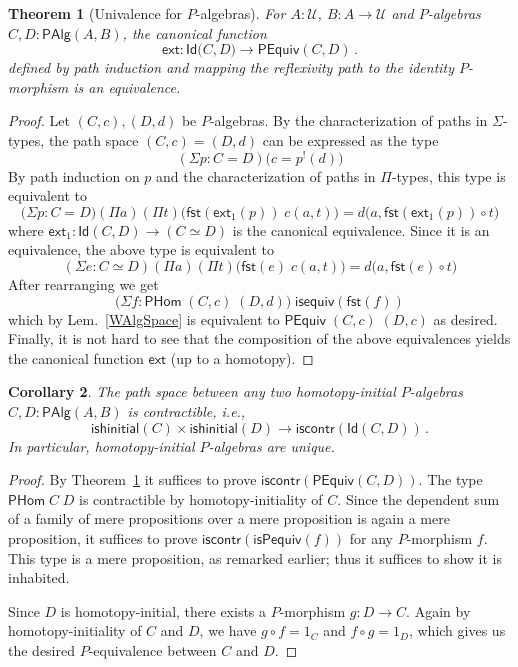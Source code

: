 \documentclass[10pt,a4paper,oneside,reqno]{amsart}
\numberwithin{equation}{section}
\theoremstyle{mythm}
\newtheorem{theorem}{Theorem}[section]
\newtheorem{corollary}[theorem]{Corollary}
\theoremstyle{mydef}
\theoremstyle{myrmk}
\newcommand{\co}{\colon}
\newcommand{\comp}{\circ}
\newcommand{\iscontr}{\mathsf{iscontr}}
\newcommand{\isequiv}{\mathsf{isequiv}}
\newcommand{\ext}{\mathsf{ext}}
\newcommand{\U}{\mathcal{U}}
\newcommand{\fst}{\mathsf{fst}}
\newcommand{\Id}{\mathsf{Id}}
\newcommand{\WAlg}{\mathsf{PAlg}}
\newcommand{\WHom}{\mathsf{PHom}}
\begin{document}
\begin{theorem}[Univalence for $P$-algebras] \label{thm:Punivalence}
For $A:\U$, $B : A \to \U$ and $P$-algebras $C,D  : \WAlg(A,B)$, the canonical function
\[ 
\ext : \Id \big(C,D\big) \to  \mathsf{PEquiv}(C,D) \, .
\]
defined by path induction and mapping the reflexivity path to the identity $P$-morphism is an equivalence.
\end{theorem}
\begin{proof} 
Let $ (C,c), (D,d)$ be $P$-algebras. By the characterization of paths in $\Sigma$-types, the path space $(C,c) = (D,d)$ can be expressed as the type
\[(\Sigma p : C = D) \big( c = p^{!}(d) \big)\]
By path induction on $p$ and the characterization of paths in $\Pi$-types, this type is equivalent to
\[  \big(\Sigma p : C = D\big) (\Pi a) (\Pi t) \Big(\fst(\ext_1(p)) \; c(a,t)\Big) = d\Big(a, \fst(\ext_1(p)) \comp t\Big) \]
where $\ext_1 \co \Id(C,D) \to (C \simeq D)$ is the canonical equivalence. Since it is an equivalence, the above type is equivalent to
\[(\Sigma e : C \simeq D) (\Pi a) (\Pi t) \Big(\fst(e) \; c(a,t)\Big) = d\Big(a, \fst(e) \comp t\Big) \]
After rearranging we get
\[
 \big(\Sigma f \co \WHom \; (C,c) \; (D,d)\big) \; \isequiv(\fst(f))
\]
which by Lem.~\ref{WAlgSpace} is equivalent to $\mathsf{PEquiv}\; (C,c) \; (D,c)$ as desired. Finally, it is not hard to see that the composition of the above equivalences yields the canonical function $\ext$ (up to a homotopy).
\end{proof} 

\begin{corollary}\label{WHInitIso}
The path space between any two homotopy-initial $P$-algebras $C,D : \WAlg(A,B)$ is contractible, i.e., 
\[ 
\mathsf{ishinitial}(C) \times \mathsf{ishinitial}(D) \to \iscontr(\Id(C,D)) \, .
\] 
In particular, homotopy-initial $P$-algebras are unique.
\end{corollary}

\begin{proof}
By Theorem~\ref{thm:Punivalence} it suffices to prove $\iscontr(\mathsf{PEquiv}(C,D))$. The type $\WHom \; C \; D$ is contractible by homotopy-initiality of $C$. Since the dependent sum of a family of mere propositions over a mere proposition is again a mere proposition, it suffices to prove $\iscontr(\mathsf{isPequiv}(f))$ for any $P$-morphism $f$. This type is a mere proposition, as remarked earlier; thus it suffices to show it is inhabited.

Since $D$ is homotopy-initial, there exists a $P$-morphism $g : D \to C$. Again by homotopy-initiality of $C$ and $D$, we have $g \comp f = 1_C$ and $f \comp g = 1_D$, which gives us the desired $P$-equivalence between $C$ and $D$.
\end{proof}
\end{document}
